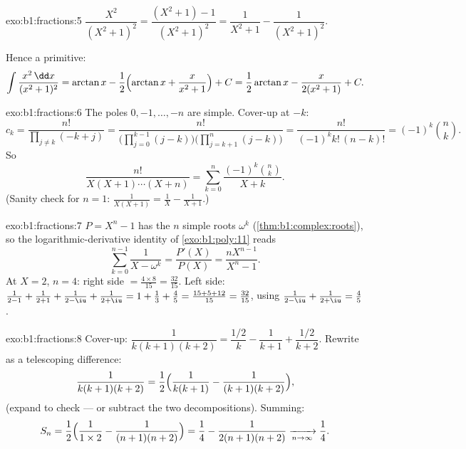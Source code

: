 \begin{solution}{exo:b1:fractions:5}
$\dfrac{X^2}{(X^2+1)^2} = \dfrac{(X^2 + 1) - 1}{(X^2+1)^2} =
\dfrac{1}{X^2+1} - \dfrac{1}{(X^2+1)^2}$.

Hence a primitive:
\[
\int \frac{x^2\,\dd x}{(x^2+1)^2}
= \arctan x - \frac12\Bigl(\arctan x + \frac{x}{x^2+1}\Bigr) + C
= \frac12\arctan x - \frac{x}{2(x^2+1)} + C .
\]
\end{solution}

\begin{solution}{exo:b1:fractions:6}
The poles $0, -1, \dots, -n$ are simple. Cover-up at $-k$:
\[
c_k = \frac{n!}{\prod_{j \neq k} (-k + j)}
= \frac{n!}{\bigl(\prod_{j=0}^{k-1}(j - k)\bigr)
\bigl(\prod_{j=k+1}^{n}(j-k)\bigr)}
= \frac{n!}{(-1)^k k!\,(n-k)!} = (-1)^k \binom nk .
\]
So
\[
\frac{n!}{X(X+1)\cdots(X+n)}
= \sum_{k=0}^{n} \frac{(-1)^k \binom nk}{X + k} .
\]
(Sanity check for $n = 1$: $\frac{1}{X(X+1)} = \frac1X -
\frac{1}{X+1}$.)
\end{solution}

\begin{solution}{exo:b1:fractions:7}
$P = X^n - 1$ has the $n$ simple roots $\omega^k$
(\cref{thm:b1:complex:roots}), so the logarithmic-derivative identity
of \cref{exo:b1:poly:11} reads
\[
\sum_{k=0}^{n-1} \frac{1}{X - \omega^k}
= \frac{P'(X)}{P(X)} = \frac{n X^{n-1}}{X^n - 1} .
\]
At $X = 2$, $n = 4$: right side $= \frac{4 \times 8}{15} =
\frac{32}{15}$. Left side: $\frac{1}{2-1} + \frac{1}{2+1} +
\frac{1}{2 - \iu} + \frac{1}{2 + \iu} = 1 + \frac13 + \frac{4}{5} =
\frac{15 + 5 + 12}{15} = \frac{32}{15}$, using $\frac{1}{2-\iu} +
\frac{1}{2+\iu} = \frac{4}{5}$.
\end{solution}

\begin{solution}{exo:b1:fractions:8}
Cover-up: $\dfrac{1}{k(k+1)(k+2)} = \dfrac{1/2}{k} - \dfrac{1}{k+1} +
\dfrac{1/2}{k+2}$. Rewrite as a telescoping difference:
\[
\frac{1}{k(k+1)(k+2)}
= \frac12\Bigl(\frac{1}{k(k+1)} - \frac{1}{(k+1)(k+2)}\Bigr),
\]
(expand to check --- or subtract the two decompositions). Summing:
\[
S_n = \frac12\Bigl(\frac{1}{1 \times 2} - \frac{1}{(n+1)(n+2)}\Bigr)
= \frac14 - \frac{1}{2(n+1)(n+2)}
\xrightarrow[n \to \infty]{} \frac14 .
\]
\end{solution}

